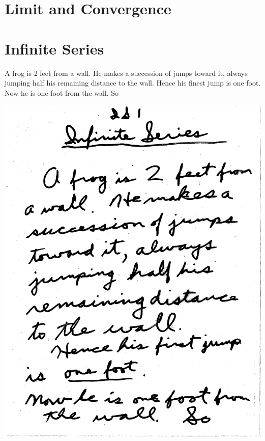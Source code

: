 \documentclass[10pt,a4paper]{article}
\begin{document}
\newpage












\section{Limit and Convergence}




\section{Infinite Series}

A frog is 2 feet from a wall. He makes a succession of jumps toward it, always jumping half his remaining distance to the wall. Hence his finest jump is one foot. Now he is one foot from the wall. So

\includegraphics[scale=.5]{Pages/IS_1}
\end{document}
